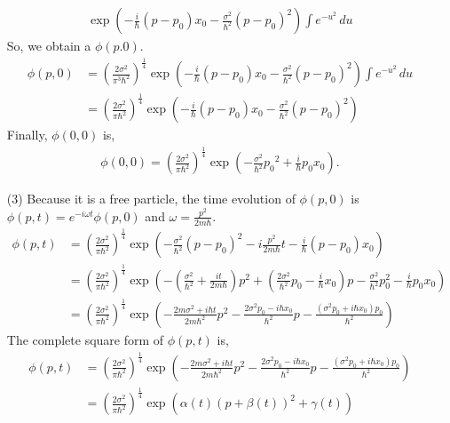 \documentclass[floatfix,nofootinbib,superscriptaddress,fleqn]{revtex4}
\begin{document}
\begin{itemize}
\begin{align}
    \exp\left( -\frac{i}{\hbar}(p-p_0)x_0-\frac{\sigma^2}{\hbar^2}(p-p_0)^2 \right)
    \int e^{-u^2}\,du
  \end{align}
  So, we obtain a $\phi(p.0)$.
  \begin{align}
    \phi(p,0) &= {\left(\frac{2\sigma^2}{\pi^3\hbar^2}\right)}^{\frac{1}{4}}
    \exp\left( -\frac{i}{\hbar}(p-p_0)x_0-\frac{\sigma^2}{\hbar^2}(p-p_0)^2 \right)
    \int e^{-u^2}\,du \\
    &= {\left(\frac{2\sigma^2}{\pi\hbar^2}\right)}^{\frac{1}{4}}
    \exp\left( -\frac{i}{\hbar}(p-p_0)x_0-\frac{\sigma^2}{\hbar^2}(p-p_0)^2 \right)
  \end{align}
  Finally, $\phi(0,0)$ is,
  \begin{align}
    \phi(0,0) = {\left(\frac{2\sigma^2}{\pi\hbar^2}\right)}^{\frac{1}{4}}
    \exp\left(-\frac{\sigma^2}{\hbar^2}{p_0}^2+\frac{i}{\hbar}p_0x_0\right).
  \end{align}
  \item[(3)]Because it is a free particle, the time evolution of 
  $\phi(p,0)$ is $\phi(p,t)=e^{-i\omega t}\phi(p,0)$ and $\omega = \frac{p^2}{2m\hbar}$.
  \begin{align}
    \phi(p,t) &={\left(\frac{2\sigma^2}{\pi\hbar^2}\right)}^{\frac{1}{4}}
      \exp\left(-\frac{\sigma^2}{\hbar^2}(p-p_0)^2-i\frac{p^2}{2m\hbar}t
      -\frac{i}{\hbar}(p-p_0)x_0 \right) \\
    &={\left(\frac{2\sigma^2}{\pi\hbar^2}\right)}^{\frac{1}{4}}
      \exp\left(-\left(\frac{\sigma^2}{\hbar^2} 
     +\frac{it}{2m\hbar}\right)p^2 
     +\left(\frac{2\sigma^2}{\hbar^2}p_0-\frac{i}{\hbar}x_0\right)p 
     -\frac{\sigma^2}{\hbar^2}p_0^2-\frac{i}{\hbar}p_0x_0 \right) \\ 
    &={\left(\frac{2\sigma^2}{\pi\hbar^2}\right)}^{\frac{1}{4}}
      \exp\left(-\frac{2m\sigma^2+i\hbar t}{2m\hbar^2}p^2 
      -\frac{2\sigma^2p_0-i\hbar x_0}{\hbar^2}p
      -\frac{\left(\sigma^2p_0+i\hbar x_0\right)p_0}{\hbar^2} \right)
  \end{align}
  The complete square form of $\phi(p,t)$ is,
  \begin{align}
    \phi(p,t) &={\left(\frac{2\sigma^2}{\pi\hbar^2}\right)}^{\frac{1}{4}}
      \exp\left(-\frac{2m\sigma^2+i\hbar t}{2m\hbar^2} p^2 
    -\frac{2\sigma^2p_0-i\hbar x_0}{\hbar^2}p
    -\frac{\left(\sigma^2p_0+i\hbar x_0\right)p_0}{\hbar^2}\right) \\
    &={\left(\frac{2\sigma^2}{\pi\hbar^2}\right)}^{\frac{1}{4}}
    \exp\left(
      \alpha(t)\left(p+\beta(t)\right)^2+\gamma(t)\right)  \\

\end{align}
\end{itemize}
\end{document}

